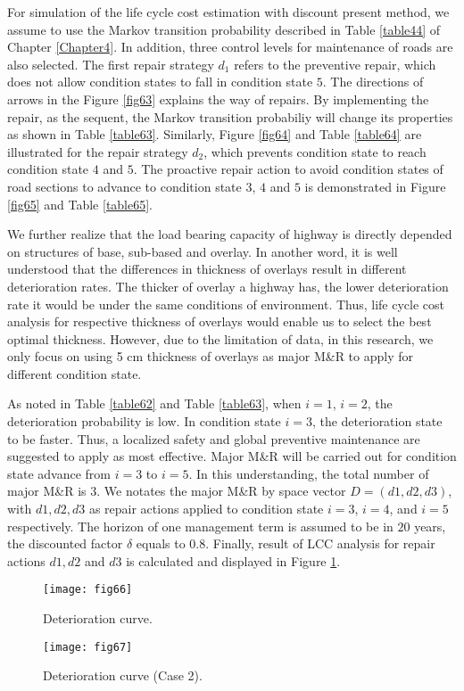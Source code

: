 For simulation of the life cycle cost estimation with discount present method, we assume to use the Markov transition probability described in Table \ref{table44} of Chapter \ref{Chapter4}. In addition, three control levels for maintenance of roads are also selected. The first repair strategy $d_1$ refers to the preventive repair, which does not allow condition states to fall in condition state $5$. The directions of arrows in the Figure \ref{fig63} explains the way of repairs. By implementing the repair, as the sequent, the Markov transition probabiliy will change its properties as shown in Table \ref{table63}. Similarly, Figure \ref{fig64} and Table \ref{table64} are illustrated for the repair strategy $d_2$, which prevents condition state to reach condition state $4$ and $5$. The proactive repair action to avoid condition states of road sections to advance to condition state $3$, $4$ and $5$ is demonstrated in Figure \ref{fig65} and Table \ref{table65}.

We further realize that the load bearing capacity of highway is directly depended on structures of base, sub-based and overlay. In another word, it is well understood that the differences in thickness of overlays result in different deterioration rates. The thicker of overlay a highway has, the lower deterioration rate it would be under the same conditions of environment. Thus, life cycle cost analysis for respective thickness of overlays would enable us to select the best optimal thickness. However, due to the limitation of data, in this research, we only focus on using 5 cm thickness of overlays as major M{\&}R to apply for different condition state. 

As noted in Table \ref{table62} and Table \ref{table63}, when $i=1$, $i= 2$, the deterioration probability is low. In condition state $i=3$, the deterioration state to be faster. Thus, a localized safety and global preventive maintenance are suggested to apply as most effective. Major M{\&}R will be carried out for condition state advance from $i=3$ to $i=5$. In this understanding, the total number of major M{\&}R is 3. We notates the major M{\&}R by space vector $D=(d1,d2,d3)$, with $d1, d2, d3$ as repair actions applied to condition state $i=3$, $i=4$, and $i=5$ respectively. The horizon of one management term is assumed to be in $20$ years, the discounted factor $\delta$ equals to 0.8. Finally, result of LCC analysis for repair actions $d1, d2$ and $d3$ is calculated and displayed in Figure \ref{fig66}.

\begin{figure}[t]
\begin{center}
\texttt{[image: fig66]}
\end{center}
\caption{Deterioration curve.}
\label{fig66}
\end{figure}%
%
\begin{figure}[t]
\begin{center}
\texttt{[image: fig67]}
\end{center}
\caption{Deterioration curve (Case 2).}
\label{fig67}
\end{figure}%


